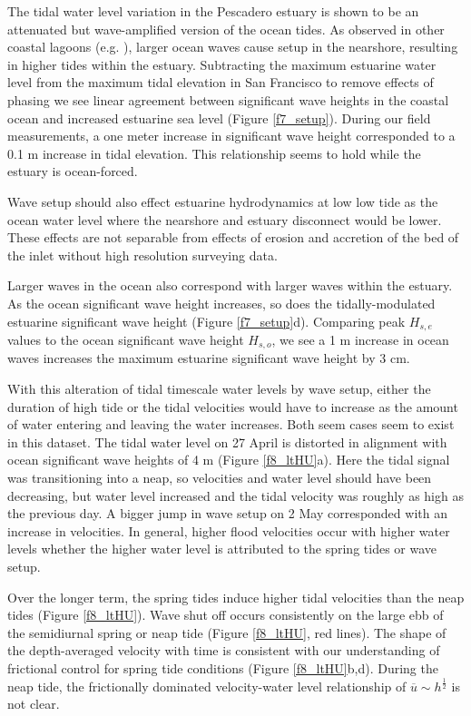 The tidal water level variation in the Pescadero estuary is shown
to be an attenuated but wave-amplified version of the ocean tides.
As observed in other coastal lagoons (e.g. \cite{malhadas_effect_2009}),
larger ocean waves cause setup in the nearshore, resulting in higher
tides within the estuary. Subtracting the maximum estuarine water
level from the maximum tidal elevation in San Francisco to remove
effects of phasing we see linear agreement between significant wave
heights in the coastal ocean and increased estuarine sea level (Figure
\ref{f7_setup}). During our field measurements, a one meter increase
in significant wave height corresponded to a 0.1 m increase in tidal
elevation. This relationship seems to hold while the estuary is ocean-forced. 

Wave setup should also effect estuarine hydrodynamics at low low tide
as the ocean water level where the nearshore and estuary disconnect
would be lower. These effects are not separable from effects of erosion
and accretion of the bed of the inlet without high resolution surveying
data. 

Larger waves in the ocean also correspond with larger waves within
the estuary. As the ocean significant wave height increases, so does
the tidally-modulated estuarine significant wave height (Figure \ref{f7_setup}d).
Comparing peak $H_{s,e}$ values to the ocean significant wave height
$H_{s,o}$, we see a 1 m increase in ocean waves increases the maximum
estuarine significant wave height by 3 cm.

With this alteration of tidal timescale water levels by wave setup,
either the duration of high tide or the tidal velocities would have
to increase as the amount of water entering and leaving the water
increases. Both seem cases seem to exist in this dataset. The tidal
water level on 27 April is distorted in alignment with ocean significant
wave heights of 4 m (Figure \ref{f8_ltHU}a). Here the tidal signal
was transitioning into a neap, so velocities and water level should
have been decreasing, but water level increased and the tidal velocity
was roughly as high as the previous day. A bigger jump in wave setup
on 2 May corresponded with an increase in velocities. In general,
higher flood velocities occur with higher water levels whether the
higher water level is attributed to the spring tides or wave setup. 

Over the longer term, the spring tides induce higher tidal velocities
than the neap tides (Figure \ref{f8_ltHU}). Wave shut off occurs
consistently on the large ebb of the semidiurnal spring or neap tide
(Figure \ref{f8_ltHU}, red lines). The shape of the depth-averaged
velocity with time is consistent with our understanding of frictional
control for spring tide conditions (Figure \ref{f8_ltHU}b,d). During
the neap tide, the frictionally dominated velocity-water level relationship
of $\overline{u}\sim h^{\frac{1}{2}}$ is not clear. 


